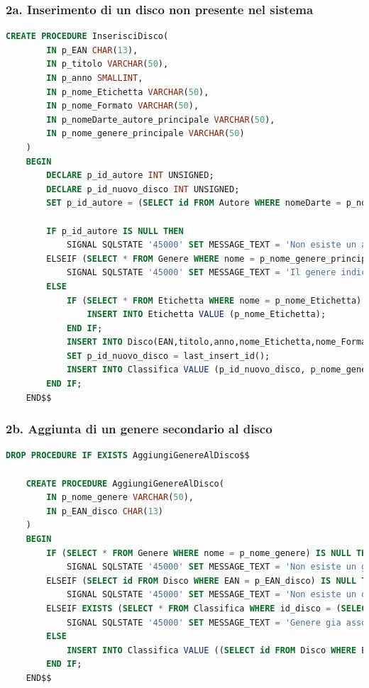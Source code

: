 \documentclass{article}
\begin{document}
\subsubsection*{2a. Inserimento di un disco non presente nel sistema}
\begin{lstlisting}[language=SQL]
    CREATE PROCEDURE InserisciDisco(
        IN p_EAN CHAR(13),
        IN p_titolo VARCHAR(50),
        IN p_anno SMALLINT,
        IN p_nome_Etichetta VARCHAR(50),
        IN p_nome_Formato VARCHAR(50),
        IN p_nomeDarte_autore_principale VARCHAR(50),
        IN p_nome_genere_principale VARCHAR(50)
    )
    BEGIN
        DECLARE p_id_autore INT UNSIGNED;
        DECLARE p_id_nuovo_disco INT UNSIGNED;
        SET p_id_autore = (SELECT id FROM Autore WHERE nomeDarte = p_nomeDarte_autore_principale);
        
        IF p_id_autore IS NULL THEN
            SIGNAL SQLSTATE '45000' SET MESSAGE_TEXT = 'Non esiste un autore con questo nome d arte';
        ELSEIF (SELECT * FROM Genere WHERE nome = p_nome_genere_principale) IS NULL THEN
            SIGNAL SQLSTATE '45000' SET MESSAGE_TEXT = 'Il genere indicato non esiste';
        ELSE
            IF (SELECT * FROM Etichetta WHERE nome = p_nome_Etichetta) IS NULL THEN
                INSERT INTO Etichetta VALUE (p_nome_Etichetta);
            END IF;
            INSERT INTO Disco(EAN,titolo,anno,nome_Etichetta,nome_Formato,id_Autore) VALUE (p_EAN,p_titolo,p_anno,p_nome_Etichetta,p_nome_Formato,p_id_autore);
            SET p_id_nuovo_disco = last_insert_id();
            INSERT INTO Classifica VALUE (p_id_nuovo_disco, p_nome_genere_principale);
        END IF;
    END$$
\end{lstlisting}
        
\subsubsection*{2b. Aggiunta di un genere secondario al disco}
\begin{lstlisting}[language=SQL]
    DROP PROCEDURE IF EXISTS AggiungiGenereAlDisco$$

    CREATE PROCEDURE AggiungiGenereAlDisco(
        IN p_nome_genere VARCHAR(50),
        IN p_EAN_disco CHAR(13)
    )
    BEGIN
        IF (SELECT * FROM Genere WHERE nome = p_nome_genere) IS NULL THEN	
            SIGNAL SQLSTATE '45000' SET MESSAGE_TEXT = 'Non esiste un genere con questo nome';
        ELSEIF (SELECT id FROM Disco WHERE EAN = p_EAN_disco) IS NULL THEN
            SIGNAL SQLSTATE '45000' SET MESSAGE_TEXT = 'Non esiste un disco con questo EAN';
        ELSEIF EXISTS (SELECT * FROM Classifica WHERE id_disco = (SELECT id FROM Disco WHERE EAN = p_EAN_disco) AND nome_genere = p_nome_genere) THEN
            SIGNAL SQLSTATE '45000' SET MESSAGE_TEXT = 'Genere gia associato al disco';
        ELSE
            INSERT INTO Classifica VALUE ((SELECT id FROM Disco WHERE EAN = p_EAN_disco), p_nome_genere);
        END IF;
    END$$
\end{lstlisting}
        
\end{document}
